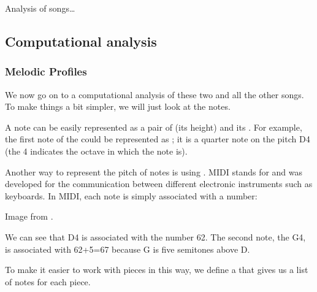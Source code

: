 \documentclass[letterpaper,10pt,english]{sphinxmanual}
\let\sphinxpxdimen\pdfpxdimen\else\newdimen\sphinxpxdimen
\begin{document}
Analysis of songs…


\subsection{Computational analysis}
\label{\detokenize{02_melody_I:Computational-analysis}}

\subsubsection{Melodic Profiles}
\label{\detokenize{02_melody_I:Melodic-Profiles}}
We now go on to a computational analysis of these two and all the other songs. To make things a bit simpler, we will just look at the notes.

A note can be easily represented as a pair of  (its height) and its . For example, the first note of the  could be represented as ; it is a quarter note on the pitch D4 (the 4 indicates the octave in which the note is).

Another way to represent the pitch of notes is using . MIDI stands for  and was developed for the communication between different electronic instruments such as keyboards. In MIDI, each note is simply associated with a number:

\sphinxincludegraphics[width=2167\sphinxpxdimen,height=465\sphinxpxdimen]{{midi_pitch}.png} Image from .

We can see that D4 is associated with the number 62. The second note, the G4, is associated with 62+5=67 because G is five semitones above D.

To make it easier to work with pieces in this way, we define a  that gives us a list of notes for each piece.
\end{document}
